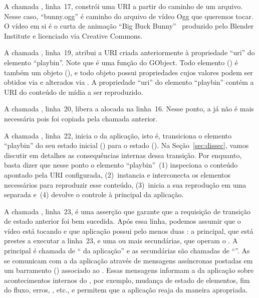 \documentclass{SBCbookchapter}
\begin{document}
A chamada , linha~17, constrói uma URI a partir do
caminho de um arquivo.  Nesse caso, ``bunny.ogg'' é caminho do arquivo de
vídeo Ogg que queremos tocar.  O vídeo em si é o curta de animação ``Big
Buck Bunny''~\cite{bunny} produzido pelo Blender Institute e licenciado via
Creative Commons.

A chamada , linha~19, atribui a URI criada anteriormente à
propriedade ``uri'' do elemento ``playbin''.  Note que  é
uma função do GObject.  Todo elemento () é também um objeto
(), e todo objeto possui propriedades cujos valores podem ser
obtidos via  e alterados via .
A propriedade ``uri'' do elemento ``playbin'' contém a URI do conteúdo de
mídia a ser reproduzido.

A chamada , linha~20, libera a  alocada na linha~16.
Nesse ponto, a  já não é mais necessária pois foi copiada pela
chamada  anterior.

A chamada , linha~22, inicia o  da
aplicação, isto é, transiciona o elemento ``playbin'' do seu estado inicial
 () para o estado 
().  Na Seção~\ref{sec:dissec}, vamos discutir em
detalhes as consequências internas dessa transição.  Por enquanto, basta
dizer que nesse ponto o elemento ``playbin''~(1) inspeciona o conteúdo
apontado pela URI configurada, (2)~instancia e interconecta os elementos
necessários para reproduzir esse conteúdo, (3)~inicia a sua reprodução em 
uma  separada e~(4) devolve o controle à  principal da
aplicação.

A chamada , linha~23, é uma asserção que garante que a
requisição de transição de estado anterior foi bem sucedida.  Após essa
linha, podemos assumir que o vídeo está tocando e que aplicação possui pelo
menos duas : a  principal, que está prestes a
executar a linha~23, e uma ou mais  secundárias, que operam o
.  A  principal é chamada de `` da
aplicação'' e as  secundárias são chamadas de ``''.  As  se comunicam com a  da
aplicação através de mensagens assíncronas postadas em um barramento
() associado ao .  Essas mensagens informam a
 da aplicação sobre acontecimentos internos do , por
exemplo, mudança de estado de elementos, fim do fluxo, erros, ,
etc., e permitem que a aplicação reaja da maneira apropriada.
\end{document}
